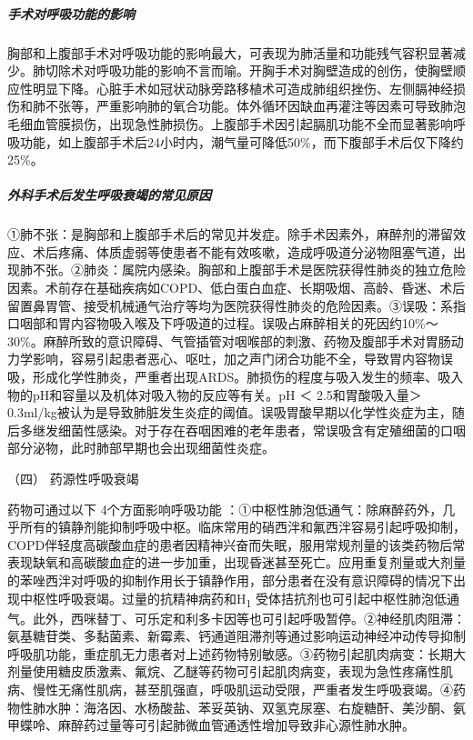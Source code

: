 \subparagraph{手术对呼吸功能的影响}

胸部和上腹部手术对呼吸功能的影响最大，可表现为肺活量和功能残气容积显著减少。肺切除术对呼吸功能的影响不言而喻。开胸手术对胸壁造成的创伤，使胸壁顺应性明显下降。心脏手术如冠状动脉旁路移植术可造成肺组织挫伤、左侧膈神经损伤和肺不张等，严重影响肺的氧合功能。体外循环因缺血再灌注等因素可导致肺泡毛细血管膜损伤，出现急性肺损伤。上腹部手术因引起膈肌功能不全而显著影响呼吸功能，如上腹部手术后24小时内，潮气量可降低50\%，而下腹部手术后仅下降约25\%。

\subparagraph{外科手术后发生呼吸衰竭的常见原因}

①肺不张：是胸部和上腹部手术后的常见并发症。除手术因素外，麻醉剂的滞留效应、术后疼痛、体质虚弱等使患者不能有效咳嗽，造成呼吸道分泌物阻塞气道，出现肺不张。②肺炎：属院内感染。胸部和上腹部手术是医院获得性肺炎的独立危险因素。术前存在基础疾病如COPD、低白蛋白血症、长期吸烟、高龄、昏迷、术后留置鼻胃管、接受机械通气治疗等均为医院获得性肺炎的危险因素。③误吸：系指口咽部和胃内容物吸入喉及下呼吸道的过程。误吸占麻醉相关的死因约10\%～30\%。麻醉所致的意识障碍、气管插管对咽喉部的刺激、药物及腹部手术对胃肠动力学影响，容易引起患者恶心、呕吐，加之声门闭合功能不全，导致胃内容物误吸，形成化学性肺炎，严重者出现ARDS。肺损伤的程度与吸入发生的频率、吸入物的pH和容量以及机体对吸入物的反应等有关。pH
＜ 2.5和胃酸吸入量＞
0.3ml/kg被认为是导致肺脏发生炎症的阈值。误吸胃酸早期以化学性炎症为主，随后多继发细菌性感染。对于存在吞咽困难的老年患者，常误吸含有定殖细菌的口咽部分泌物，此时肺部早期也会出现细菌性炎症。

\hypertarget{text00076.htmlux5cux23CHP3-4-1-2-4}{}
（四） 药源性呼吸衰竭

药物可通过以下 4个方面影响呼吸功能
：①中枢性肺泡低通气：除麻醉药外，几乎所有的镇静剂能抑制呼吸中枢。临床常用的硝西泮和氟西泮容易引起呼吸抑制，COPD伴轻度高碳酸血症的患者因精神兴奋而失眠，服用常规剂量的该类药物后常表现缺氧和高碳酸血症的进一步加重，出现昏迷甚至死亡。应用重复剂量或大剂量的苯唑西泮对呼吸的抑制作用长于镇静作用，部分患者在没有意识障碍的情况下出现中枢性呼吸衰竭。过量的抗精神病药和H\textsubscript{1}
受体拮抗剂也可引起中枢性肺泡低通气。此外，西咪替丁、可乐定和利多卡因等也可引起呼吸暂停。②神经肌肉阻滞：氨基糖苷类、多黏菌素、新霉素、钙通道阻滞剂等通过影响运动神经冲动传导抑制呼吸肌功能，重症肌无力患者对上述药物特别敏感。③药物引起肌肉病变：长期大剂量使用糖皮质激素、氟烷、乙醚等药物可引起肌肉病变，表现为急性疼痛性肌病、慢性无痛性肌病，甚至肌强直，呼吸肌运动受限，严重者发生呼吸衰竭。④药物性肺水肿：海洛因、水杨酸盐、苯妥英钠、双氢克尿塞、右旋糖酐、美沙酮、氨甲蝶呤、麻醉药过量等可引起肺微血管通透性增加导致非心源性肺水肿。

